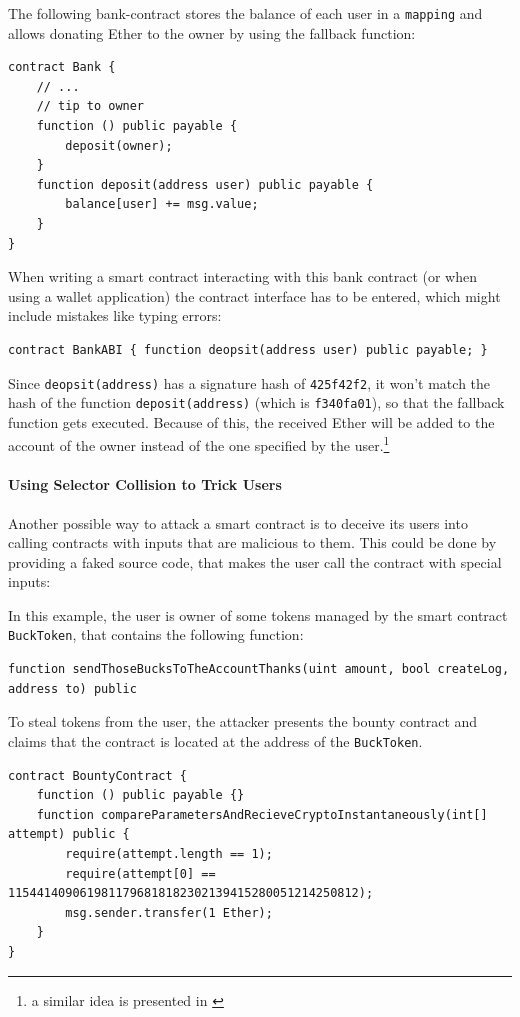 The following bank-contract stores the balance of each user in a \texttt{mapping} and allows donating Ether to the owner by using the fallback function:
\begin{verbatim}
contract Bank {
    // ...
    // tip to owner
    function () public payable {
        deposit(owner);
    }
    function deposit(address user) public payable {
        balance[user] += msg.value;
    }
}
\end{verbatim}

When writing a smart contract interacting with this bank contract (or when using a wallet application) the contract interface has to be entered, which might include mistakes like typing errors:
\begin{verbatim}
contract BankABI { function deopsit(address user) public payable; }
\end{verbatim}

Since \texttt{deopsit(address)} has a signature hash of \texttt{425f42f2}, it won't match the hash of the function \texttt{deposit(address)} (which is \texttt{f340fa01}), so that the fallback function gets executed. Because of this, the received Ether will be added to the account of the owner instead of the one specified by the user.\footnote{a similar idea is presented in \cite[wrong\_interface]{trailofbits:notsosmartcontracts}}

\paragraph{Using Selector Collision to Trick Users}
Another possible way to attack a smart contract is to deceive its users into calling contracts with inputs that are malicious to them. This could be done by providing a faked source code, that makes the user call the contract with special inputs:

In this example, the user is owner of some tokens managed by the smart contract \texttt{BuckToken}, that contains the following function:
\begin{verbatim}
function sendThoseBucksToTheAccountThanks(uint amount, bool createLog, address to) public
\end{verbatim}

To steal tokens from the user, the attacker presents the bounty contract and claims that the contract is located at the address of the \texttt{BuckToken}.

\begin{verbatim}
contract BountyContract {
    function () public payable {}
    function compareParametersAndRecieveCryptoInstantaneously(int[] attempt) public {
        require(attempt.length == 1);
        require(attempt[0] == 1154414090619811796818182302139415280051214250812);
        msg.sender.transfer(1 Ether);
    }
}
\end{verbatim}

